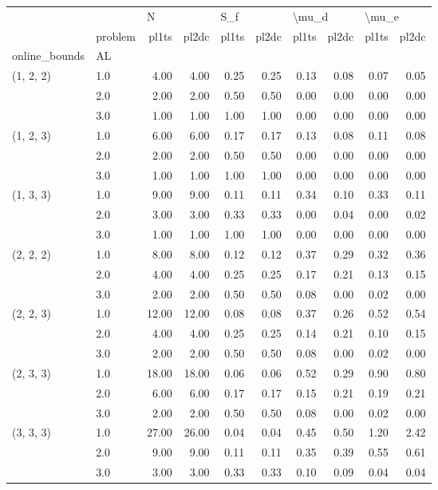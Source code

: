 \begin{tabular}{llrrrrrrrr}
\toprule
          & {} & \multicolumn{2}{l}{N} & \multicolumn{2}{l}{S\_f} & \multicolumn{2}{l}{\textbackslash mu\_d} & \multicolumn{2}{l}{\textbackslash mu\_e} \\
          & problem & pl1ts & pl2dc & pl1ts & pl2dc & pl1ts & pl2dc & pl1ts & pl2dc \\
online\_bounds & AL &       &       &       &       &       &       &       &       \\
\midrule
(1, 2, 2) & 1.0 &  4.00 &  4.00 &  0.25 &  0.25 &  0.13 &  0.08 &  0.07 &  0.05 \\
          & 2.0 &  2.00 &  2.00 &  0.50 &  0.50 &  0.00 &  0.00 &  0.00 &  0.00 \\
          & 3.0 &  1.00 &  1.00 &  1.00 &  1.00 &  0.00 &  0.00 &  0.00 &  0.00 \\
(1, 2, 3) & 1.0 &  6.00 &  6.00 &  0.17 &  0.17 &  0.13 &  0.08 &  0.11 &  0.08 \\
          & 2.0 &  2.00 &  2.00 &  0.50 &  0.50 &  0.00 &  0.00 &  0.00 &  0.00 \\
          & 3.0 &  1.00 &  1.00 &  1.00 &  1.00 &  0.00 &  0.00 &  0.00 &  0.00 \\
(1, 3, 3) & 1.0 &  9.00 &  9.00 &  0.11 &  0.11 &  0.34 &  0.10 &  0.33 &  0.11 \\
          & 2.0 &  3.00 &  3.00 &  0.33 &  0.33 &  0.00 &  0.04 &  0.00 &  0.02 \\
          & 3.0 &  1.00 &  1.00 &  1.00 &  1.00 &  0.00 &  0.00 &  0.00 &  0.00 \\
(2, 2, 2) & 1.0 &  8.00 &  8.00 &  0.12 &  0.12 &  0.37 &  0.29 &  0.32 &  0.36 \\
          & 2.0 &  4.00 &  4.00 &  0.25 &  0.25 &  0.17 &  0.21 &  0.13 &  0.15 \\
          & 3.0 &  2.00 &  2.00 &  0.50 &  0.50 &  0.08 &  0.00 &  0.02 &  0.00 \\
(2, 2, 3) & 1.0 & 12.00 & 12.00 &  0.08 &  0.08 &  0.37 &  0.26 &  0.52 &  0.54 \\
          & 2.0 &  4.00 &  4.00 &  0.25 &  0.25 &  0.14 &  0.21 &  0.10 &  0.15 \\
          & 3.0 &  2.00 &  2.00 &  0.50 &  0.50 &  0.08 &  0.00 &  0.02 &  0.00 \\
(2, 3, 3) & 1.0 & 18.00 & 18.00 &  0.06 &  0.06 &  0.52 &  0.29 &  0.90 &  0.80 \\
          & 2.0 &  6.00 &  6.00 &  0.17 &  0.17 &  0.15 &  0.21 &  0.19 &  0.21 \\
          & 3.0 &  2.00 &  2.00 &  0.50 &  0.50 &  0.08 &  0.00 &  0.02 &  0.00 \\
(3, 3, 3) & 1.0 & 27.00 & 26.00 &  0.04 &  0.04 &  0.45 &  0.50 &  1.20 &  2.42 \\
          & 2.0 &  9.00 &  9.00 &  0.11 &  0.11 &  0.35 &  0.39 &  0.55 &  0.61 \\
          & 3.0 &  3.00 &  3.00 &  0.33 &  0.33 &  0.10 &  0.09 &  0.04 &  0.04 \\
\bottomrule
\end{tabular}
